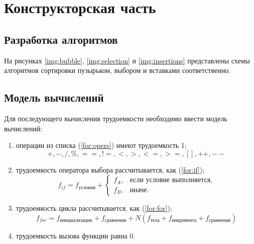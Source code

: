 \chapter{Конструкторская часть}

\section{Разработка алгоритмов}

На рисунках \ref{img:bubble}, \ref{img:selection} и \ref{img:insertions} представлены схемы алгоритмов сортировки пузырьком, выбором и вставками соответственно.

\clearpage
{}

\section{Модель вычислений}

Для последующего вычисления трудоемкости необходимо ввести модель вычислений:
\begin{enumerate}
    \item операции из списка (\ref{for:opers}) имеют трудоемкость 1;
        \begin{equation}
            \label{for:opers}
            +, -, /, \%, ==, !=, <, >, <=, >=, [], ++, {-}-
        \end{equation}
    \item трудоемкость оператора выбора  рассчитывается, как (\ref{for:if});
	\begin{equation}
        \label{for:if}
        f_{if} = f_{\text{условия}} +
        \begin{cases}
        f_A, & \text{если условие выполняется,}\\
        f_B, & \text{иначе.}
        \end{cases}
	\end{equation}
\item трудоемкость цикла рассчитывается, как (\ref{for:for});
    \begin{equation}
        \label{for:for}
        f_{for} = f_{\text{инициализации}} + f_{\text{сравнения}} + N(f_{\text{тела}} + f_{\text{инкремента}} + f_{\text{сравнения}})
    \end{equation}
	\item трудоемкость вызова функции равна 0.
\end{enumerate}


